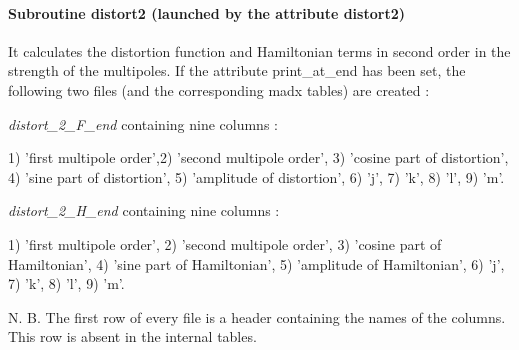 
\paragraph{Subroutine distort2 (launched by the attribute distort2)}  It calculates the distortion function and Hamiltonian terms in second order in the strength of the multipoles. If the attribute print\_at\_end has been set, the following two files  (and the corresponding madx tables) are created : 

\textit{distort\_2\_F\_end} containing nine columns : 

 1) 'first multipole order',2) 'second multipole order',  3) 'cosine part of distortion', 4) 'sine part of distortion', 5) 'amplitude of distortion', 6) 'j', 7) 'k', 8) 'l', 9) 'm'. 
 
\textit{distort\_2\_H\_end}  containing nine columns :  

 1) 'first multipole order', 2) 'second multipole order',  3) 'cosine part of Hamiltonian', 4) 'sine part of Hamiltonian', 5) 'amplitude of Hamiltonian', 6) 'j', 7) 'k', 8) 'l', 9) 'm'.  


 N. B. The first row of every file is a header containing the names of the columns. This row is absent in the internal tables. 



